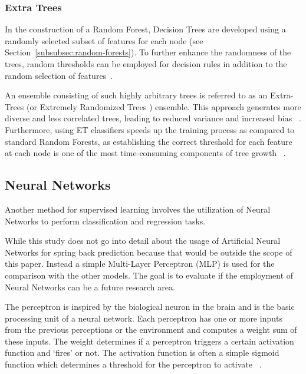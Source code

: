 {\subsubsection{Extra Trees}\label{subsubsec:extra-trees}
In the construction of a Random Forest, Decision Trees are developed using a randomly selected subset of features for
each node (see Section~\ref{subsubsec:random-forests}). To further enhance the randomness of the trees, random
thresholds can be employed for decision rules in addition to the random selection of
features~\cite[p. 351]{geron2022hands}.

An ensemble consisting of such highly arbitrary trees is referred to as an Extra-Trees (or Extremely Randomized Trees
) ensemble.
This approach generates more diverse and less correlated trees, leading to reduced variance and increased
bias
~\cite[p. 351]{geron2022hands}.
Furthermore, using ET classifiers speeds up the training process as compared to standard Random Forests, as
establishing the correct threshold for each feature at each node is one of the most time-consuming components of tree
growth
~\cite[p. 351]{geron2022hands}.

\subsection{Neural Networks}\label{subsec:neural-networks}
Another method for supervised learning involves the utilization of Neural Networks to
perform classification and regression tasks.

While this study does not go into detail about the usage of Artificial Neural Networks for spring back prediction
because that would be outside the scope of this paper.
Instead a simple Multi-Layer Perceptron (MLP) is used for the comparison with the other models.
The goal is to evaluate if the employment of Neural Networks can be a future research area.

The perceptron is inspired by the biological neuron in the brain and is the basic processing unit of a neural
network.
Each perceptron has one or more inputs from the previous perceptions or the environment and computes a weight sum of
these inputs.
The weight determines if a perceptron triggers a certain activation function and `fires' or
not.
The activation function is often a simple sigmoid function which determines a threshold for the perceptron to activate
~\cite[pp. 271--273]{alpaydin2020introduction}.

}
